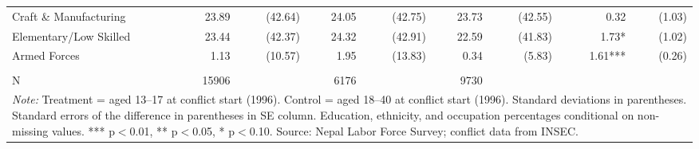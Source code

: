 \begin{landscape}
\begin{table}[!h]
{\begin{tabular}[t]{lrrrrrrrr}
Craft \& Manufacturing & 23.89 & (42.64) & 24.05 & (42.75) & 23.73 & (42.55) & 0.32 & (1.03)\\
\addlinespace
Elementary/Low Skilled & 23.44 & (42.37) & 24.32 & (42.91) & 22.59 & (41.83) & 1.73* & (1.02)\\
Armed Forces & 1.13 & (10.57) & 1.95 & (13.83) & 0.34 & (5.83) & 1.61*** & (0.26)\\
 &  &  &  &  &  &  &  & \\
N & 15906 &  & 6176 &  & 9730 &  &  & \\
\bottomrule
\multicolumn{9}{l}{\rule{0pt}{1em}\textit{Note: } Treatment = aged 13--17 at conflict start (1996). Control = aged 18--40 at conflict start (1996). Standard deviations in parentheses. Standard errors of the difference in parentheses in SE column. Education, ethnicity, and occupation percentages conditional on non-missing values. *** p$<$0.01, ** p$<$0.05, * p$<$0.10. Source: Nepal Labor Force Survey; conflict data from INSEC.}\\
\end{tabular}}
\end{table}
\end{landscape}
